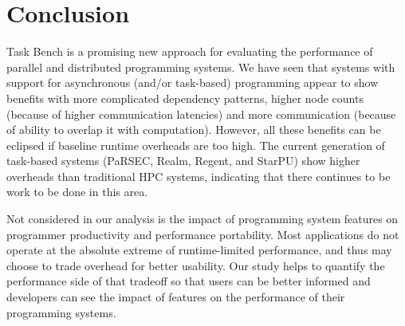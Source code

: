 \section{Conclusion}
\label{sec:conclusion}

Task Bench is a promising new approach for evaluating the performance
of parallel and distributed programming systems. We have seen that
systems with support for asynchronous (and/or task-based) programming
appear to show benefits with more complicated dependency patterns,
higher node counts (because of higher communication latencies) and
more communication (because of ability to overlap it with
computation). However, all these benefits can be eclipsed if baseline
runtime overheads are too high. The current generation of task-based
systems (PaRSEC, Realm, Regent, and StarPU) show higher overheads
than traditional HPC systems, indicating that there continues to be
work to be done in this area.

Not considered in our analysis is the impact of programming system
features on programmer productivity and performance portability. Most
applications do not operate at the absolute extreme of runtime-limited
performance, and thus may choose to trade overhead for better
usability. Our study helps to quantify the performance side of that
tradeoff so that users can be better informed and developers can see
the impact of features on the performance of their programming
systems.
